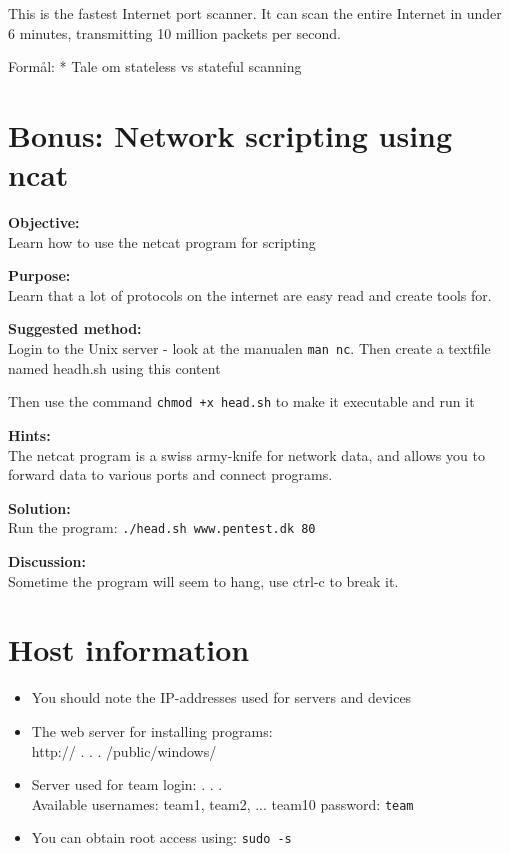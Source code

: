 \documentclass[a4paper,11pt,notitlepage]{report}
\begin{document}
This is the fastest Internet port scanner. It can scan the entire Internet in under 6 minutes, transmitting 10 million packets per second.

Formål:
* Tale om stateless vs stateful scanning




\chapter{Bonus: Network scripting using ncat}
\label{ex:netcat-1}

{\bf Objective:} \\
Learn how to use the netcat program for scripting

{\bf Purpose:}\\
Learn that a lot of protocols on the internet are easy read and create tools for.

{\bf Suggested method:} \\
Login to the Unix server - look at the manualen \verb+man nc+.
Then create a textfile named headh.sh using this content
\begin{alltt}

\end{alltt}

Then use the command \verb#chmod +x head.sh# to make it executable and run it

{\bf Hints:}\\
The netcat program is a swiss army-knife for network data, and allows you to forward data to various ports and connect programs.

{\bf Solution:}\\
Run the program: \verb+./head.sh www.pentest.dk 80+


{\bf Discussion:}\\

Sometime the program will seem to hang, use ctrl-c to break it.


\appendix
\rhead{\fancyplain{}{\bf \leftmark}}

\normal

\chapter{\color{titlecolor}Host information}

\begin{itemize}
\item You should note the IP-addresses used for servers and devices
\item The web server for installing programs:\\
http:// \hskip 15mm .\hskip 15mm .\hskip 15mm .\hskip 15mm
/public/windows/
\item Server used for team login: \hskip 15mm .\hskip 15mm .\hskip 15mm .\hskip 15mm \\
Available usernames: team1, team2, ... team10
password: \verb+team+
\item You can obtain root access using: \verb+sudo -s+
\end{itemize}
\end{document}
